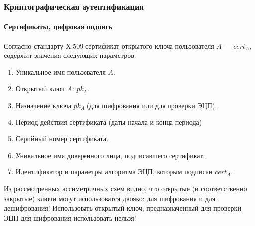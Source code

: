 
\begin{frame}
    \frametitle{Криптографическая аутентификация}
    \framesubtitle{Сертификаты, цифровая подпись}
    Согласно стандарту X.509 сертификат открытого ключа пользователя $A$ --- $cert_A$, содержит значения следующих параметров.
    \begin{enumerate}
        \item Уникальное имя пользователя $A$.
        \item Открытый ключ $A$: $pk_A$.
        \item Назначение ключа $pk_A$ (для шифрования или для проверки ЭЦП).
        \item Период действия сертификата (даты начала и конца периода)
        \item Серийный номер сертификата.
        \item Уникальное имя доверенного лица, подписавшего сертификат.
        \item Идентификатор и параметры алгоритма ЭЦП, которым подписан $cert_A$.
    \end{enumerate}
\end{frame}

Из рассмотренных ассиметричных схем видно, что открытые (и соответственно закрытые) ключи могут использоватся двояко: для шифрования и для дешифрования! Использовать открытый ключ, предназначенный для проверки ЭЦП для шифрования использовать нельзя!


